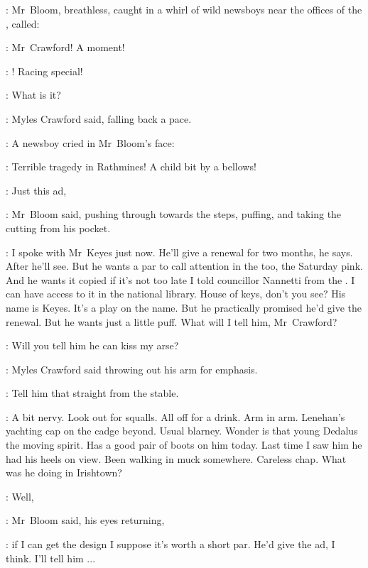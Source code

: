 :
Mr~Bloom,
breathless,
caught in a whirl of wild newsboys
near the offices of the ,
called:

\Bloom:
Mr~Crawford!
A moment!

\boy:
!
Racing special!

\crawford:
What is it?

:
Myles Crawford said,
falling back a pace.

:
A newsboy cried in Mr~Bloom's face:

\boy:
Terrible tragedy in Rathmines!
A child bit by a bellows!



\Bloom:
Just this ad,

:
Mr~Bloom said,
pushing through towards the steps,
puffing,
and taking the cutting from his pocket.

\Bloom:
I spoke with Mr~Keyes just now.
He'll give a renewal for two months, he says.
After he'll see.
But he wants a par to call attention in the  too,
the Saturday pink.
And he wants it copied if it's not too late
I told councillor Nannetti from the .
I can have access to it in the national library.
House of keys, don't you see?
His name is Keyes.
It's a play on the name.
But he practically promised he'd give the renewal.
But he wants
just a little puff.
What will I tell him, Mr~Crawford?



\crawford:
Will you tell him he can kiss my arse?

:
Myles Crawford said
throwing out his arm for emphasis.

\crawford:
Tell him that straight from the stable.

\BloomInt:
A bit nervy.
Look out for squalls.
All off for a drink.
Arm in arm.
Lenehan's yachting cap on the cadge beyond.
Usual blarney.
Wonder is that young Dedalus the moving spirit.
Has a good pair of boots on him today.
Last time I saw him he had his heels on view.
Been walking in muck somewhere.
Careless chap.
What was he doing in Irishtown?

\Bloom:
Well,

:
Mr~Bloom said,
his eyes returning,

\Bloom:
if I can get the design
I suppose it's worth a short par.
He'd give the ad, I think.
I'll tell him ...



